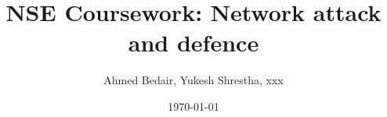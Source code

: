 \documentclass[12pt]{informatics-report}
\title{NSE Coursework: Network attack and defence}
\author{Ahmed Bedair, Yukesh Shrestha, xxx}
\date{\today}
\begin{document}
\createFrontMatter%
\onehalfspacing%
\tableofcontents
\doublespacing%






\end{document}
